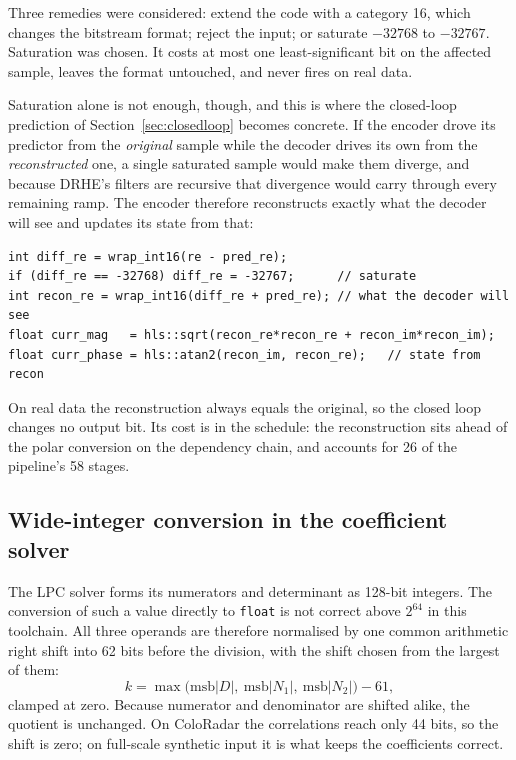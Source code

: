 Three remedies were considered: extend the code with a category 16, which
changes the bitstream format; reject the input; or saturate $-32768$ to
$-32767$. Saturation was chosen. It costs at most one least-significant bit on
the affected sample, leaves the format untouched, and never fires on real data.

Saturation alone is not enough, though, and this is where the closed-loop
prediction of Section~\ref{sec:closedloop} becomes concrete. If the encoder
drove its predictor from the \emph{original} sample while the decoder drives
its own from the \emph{reconstructed} one, a single saturated sample would make
them diverge, and because DRHE's filters are recursive that divergence would
carry through every remaining ramp. The encoder therefore reconstructs exactly
what the decoder will see and updates its state from that:

\begin{verbatim}
int diff_re = wrap_int16(re - pred_re);
if (diff_re == -32768) diff_re = -32767;      // saturate
int recon_re = wrap_int16(diff_re + pred_re); // what the decoder will see
float curr_mag   = hls::sqrt(recon_re*recon_re + recon_im*recon_im);
float curr_phase = hls::atan2(recon_im, recon_re);   // state from recon
\end{verbatim}

\noindent
On real data the reconstruction always equals the original, so the closed loop
changes no output bit. Its cost is in the schedule: the reconstruction sits
ahead of the polar conversion on the dependency chain, and accounts for 26 of
the pipeline's 58 stages.

\subsection{Wide-integer conversion in the coefficient solver}

The LPC solver forms its numerators and determinant as 128-bit integers. The
conversion of such a value directly to \texttt{float} is not correct above
$2^{64}$ in this toolchain. All three operands are therefore normalised by one
common arithmetic right shift into 62 bits before the division, with the shift
chosen from the largest of them:
\begin{equation}
k = \max\bigl(\mathrm{msb}|D|,\ \mathrm{msb}|N_1|,\ \mathrm{msb}|N_2|\bigr) - 61,
\end{equation}
clamped at zero. Because numerator and denominator are shifted alike, the
quotient is unchanged. On ColoRadar the correlations reach only 44 bits, so
the shift is zero; on full-scale synthetic input it is what keeps the
coefficients correct.


